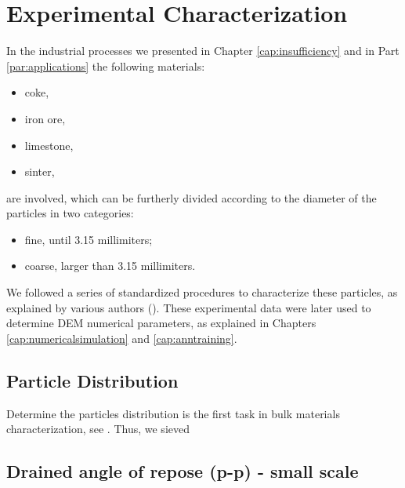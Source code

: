
\chapter[Experimental Characterization]{Experimental Characterization}
\label{cap:experimentalcharacterization}

In the industrial processes we presented in Chapter \ref{cap:insufficiency} and
in Part \ref{par:applications} the following materials:
\begin{itemize}
  \item{coke,}
  \item{iron ore,}
  \item{limestone,}
  \item{sinter,} 
\end{itemize}
are involved, which can be furtherly divided according to the diameter of the
particles in two categories:
\begin{itemize}
  \item{fine, until 3.15 millimiters;}
  \item{coarse, larger than 3.15 millimiters.}
\end{itemize}

We followed a series of standardized procedures to characterize these particles,
as explained by various authors (\citet{RefWorks:45, RefWorks:46}).
These experimental data were later used to determine \acs{DEM} numerical
parameters, as explained in Chapters \ref{cap:numericalsimulation} and
\ref{cap:anntraining}.


\section{Particle Distribution}
\label{sec:particledistribution}

Determine the particles distribution is the first task in bulk materials
characterization, see \citet{RefWorks:44}.
Thus, we sieved 




\section{Drained angle of repose (p-p) - small scale}
\label{sec:aor}


